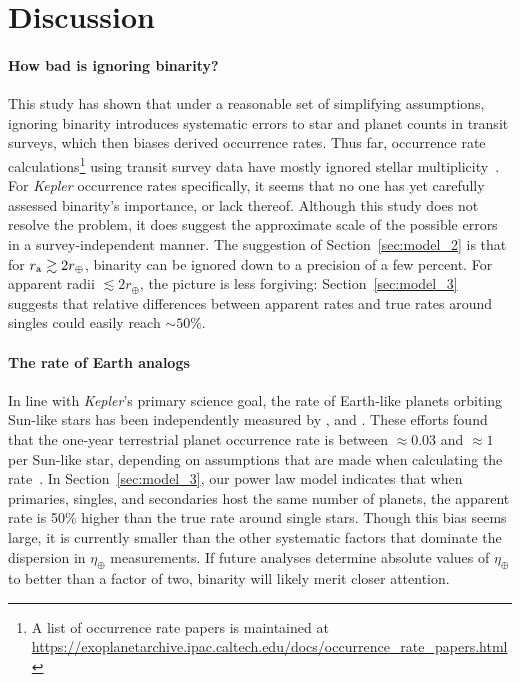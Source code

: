 \documentclass[12pt,modern]{aastex61}
\renewcommand{\a}{_{\rm a}}
\begin{document}

\section{Discussion}
\label{sec:discussion}


\paragraph{How bad is ignoring binarity?}
This study has shown that under a reasonable set of simplifying
assumptions, ignoring binarity introduces systematic errors to star
and planet counts in transit surveys, which then biases derived
occurrence rates.  Thus far, occurrence rate calculations\footnote{ A
list of occurrence rate papers is maintained at
\url{https://exoplanetarchive.ipac.caltech.edu/docs/occurrence_rate_papers.html}
} using transit survey data have mostly ignored stellar
multiplicity~\citep[\textit{e.g.},][]{howard_planet_2012,fressin_false_2013,foreman-mackey_exoplanet_2014,dressing_occurrence_2015,burke_terrestrial_2015}.
For {\it Kepler} occurrence rates specifically, it seems that no one
has yet carefully assessed binarity's importance, or lack thereof.
Although this study does not resolve the problem, it does suggest the
approximate scale of the possible errors in a survey-independent
manner.  The suggestion of Section~\ref{sec:model_2} is that for $r\a
\gtrsim 2r_\oplus$, binarity can be ignored down to a precision of a
few percent.  For apparent radii $\lesssim 2r_\oplus$, the picture is
less forgiving: Section~\ref{sec:model_3} suggests that relative
differences between apparent rates and true rates around singles could
easily reach $\sim\! 50\%$.

\paragraph{The rate of Earth analogs}
In line with {\it Kepler}'s primary science goal, the rate of
Earth-like planets orbiting Sun-like stars has been independently
measured by
\citet{youdin_exoplanet_2011,petigura_prevalence_2013,dong_fast_2013,
foreman-mackey_exoplanet_2014}, and \citet{burke_terrestrial_2015}.
These efforts found that the one-year terrestrial planet occurrence
rate is between $\approx\! 0.03$ and $\approx\!1$ per Sun-like star,
depending on assumptions that are made when calculating the
rate~\citep[see][Figure~17]{burke_terrestrial_2015}.  In
Section~\ref{sec:model_3}, our power law model indicates that when
primaries, singles, and secondaries host the same number of planets,
the apparent rate is 50\% higher than the true rate around single
stars.  Though this bias seems large, it is currently smaller than the
other systematic factors that dominate the dispersion in $\eta_\oplus$
measurements.  If future analyses determine absolute values of
$\eta_\oplus$ to better than a factor of two, binarity will likely
merit closer attention.
\end{document}
